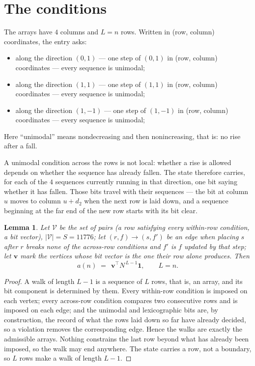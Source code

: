 \documentclass[11pt,a4paper]{article}
\theoremstyle{plain}
\newtheorem{lemma}[theorem]{Lemma}
\theoremstyle{definition}
\begin{document}
\section{The conditions}

The arrays have $4$ columns and $L=n$ rows. Written in (row, column)
coordinates, the entry asks:
\begin{itemize}
\item along the direction $(0,1)$ --- one step of $(0,1)$ in (row, column) coordinates --- every sequence is unimodal;
\item along the direction $(1,1)$ --- one step of $(1,1)$ in (row, column) coordinates --- every sequence is unimodal;
\item along the direction $(1,-1)$ --- one step of $(1,-1)$ in (row, column) coordinates --- every sequence is unimodal;
\end{itemize}
Here ``unimodal'' means nondecreasing and then nonincreasing, that is: no rise after a fall.

A unimodal condition across the rows is not local: whether a
rise is allowed depends on whether the sequence has already fallen. The state therefore
carries, for each of the $4$ sequences currently running in that direction, one bit saying
whether it has fallen. Those bits travel with their sequences --- the bit at column $u$
moves to column $u+d_2$ when the next row is laid down, and a sequence beginning at the
far end of the new row starts with its bit clear.

\begin{lemma}\label{lem:walk}
Let $\mathcal V$ be the set of pairs (a row satisfying every within-row condition, a
bit vector), $|\mathcal V|=S=11776$; let $(r,f)\to(s,f')$ be an edge when placing $s$ after $r$
breaks none of the across-row conditions and $f'$ is $f$ updated by that step; let
$\mathbf{v}$ mark the vertices whose bit vector is the one their row alone produces.
Then
\[
a(n)\;=\;\,\mathbf{v}^{\!\top}N^{\,L-1}\mathbf{1},\qquad L=n.
\]
\end{lemma}

\begin{proof}
A walk of length $L-1$ is a sequence of $L$ rows, that is, an array, and its bit component
is determined by them. Every within-row condition is imposed on each vertex; every
across-row condition compares two consecutive rows and is imposed on each edge; and the
unimodal and lexicographic bits are, by construction, the record of what the rows laid down
so far have already decided, so a violation removes the corresponding edge. Hence the walks
are exactly the admissible arrays. Nothing constrains the last row beyond what has already
been imposed, so the walk may end anywhere. The state carries a row, not a boundary, so
$L$ rows make a walk of length $L-1$.
\end{proof}
\end{document}
